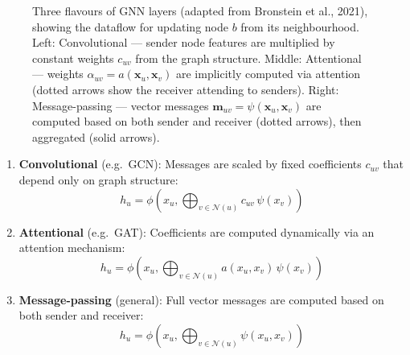 \begin{notechapter}
\begin{figure}[H]
{%
}
\caption{Three flavours of GNN layers (adapted from Bronstein et al., 2021),
         showing the dataflow for updating node $b$ from its neighbourhood.
         Left: Convolutional --- sender node features are multiplied
         by constant weights $c_{uv}$ from the graph structure.
         Middle: Attentional --- weights $\alpha_{uv} = a(\mathbf{x}_u, \mathbf{x}_v)$
         are implicitly computed via attention (dotted arrows show the
         receiver attending to senders).
         Right: Message-passing --- vector messages
         $\mathbf{m}_{uv} = \psi(\mathbf{x}_u, \mathbf{x}_v)$ are computed
         based on both sender and receiver (dotted arrows), then aggregated
         (solid arrows).}
\label{dft-to-gnn:fig:three-flavours}
\end{figure}


\begin{enumerate}
    \item \textbf{Convolutional} (e.g.\ GCN): Messages are scaled by
          fixed coefficients $c_{uv}$ that depend only on graph structure:
          \[
          h_u = \phi\left(x_u, \bigoplus_{v \in \mathcal{N}(u)} c_{uv} \, \psi(x_v)\right)
          \]

    \item \textbf{Attentional} (e.g.\ GAT): Coefficients are computed
          dynamically via an attention mechanism:
          \[
          h_u = \phi\left(x_u, \bigoplus_{v \in \mathcal{N}(u)}
              a(x_u, x_v) \, \psi(x_v)\right)
          \]

    \item \textbf{Message-passing} (general): Full vector messages are
          computed based on both sender and receiver:
          \[
          h_u = \phi\left(x_u, \bigoplus_{v \in \mathcal{N}(u)}
              \psi(x_u, x_v)\right)
          \]
\end{enumerate}


\end{notechapter}
